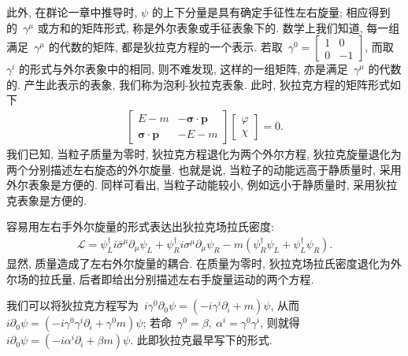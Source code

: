此外, 在群论一章中推导时, $\psi$ 的上下分量是具有确定手征性左右旋量; 相应得到的~$\gamma^\mu$ 或方和的矩阵形式, 称是外尔表象或手征表象下的. 数学上我们知道, 每一组满足~$\gamma^\mu$ 的代数的矩阵, 都是狄拉克方程的一个表示. 若取~$\gamma^0=\left[\begin{array}{cc}1&0\\0&-1\end{array}\right]$, 而取~$\gamma^i$ 的形式与外尔表象中的相同, 则不难发现, 这样的一组矩阵, 亦是满足~$\gamma^\mu$ 的代数的. 产生此表示的表象, 我们称为泡利-狄拉克表象. 此时, 狄拉克方程的矩阵形式如下
\begin{align}
\left[\begin{array}{cc}
E-m&-\bm{\sigma}\cdot\bm{p}\\
\bm{\sigma}\cdot\bm{p}&-E-m
\end{array}\right]
\left[\begin{array}{c}\varphi\\\chi\end{array}\right]=0.
\end{align}
我们已知, 当粒子质量为零时, 狄拉克方程退化为两个外尔方程, 狄拉克旋量退化为两个分别描述左右旋态的外尔旋量. 也就是说, 当粒子的动能远高于静质量时, 采用外尔表象是方便的. 同样可看出, 当粒子动能较小, 例如远小于静质量时, 采用狄拉克表象是方便的.

容易用左右手外尔旋量的形式表达出狄拉克场拉氏密度:
\begin{align}
\mathcal{L}=\psi^\dag_L i\bar{\sigma}^\mu\partial_\mu\psi_L+\psi^\dag_R i\sigma^\mu\partial_\mu\psi_R-m(\psi_R^\dag\psi_L+\psi^\dag_L\psi_R).
\end{align}
显然, 质量造成了左右外尔旋量的耦合. 在质量为零时, 狄拉克场拉氏密度退化为外尔场的拉氏量, 后者即给出分别描述左右手旋量运动的两个方程.

我们可以将狄拉克方程写为~$i\gamma^0\partial_0\psi=(-i\gamma^i\partial_i+m)\psi$, 从而~$i\partial_0\psi=(-i\gamma^0\gamma^i\partial_i+\gamma^0m)\psi$; 若命~$\gamma^0=\beta,~\alpha^i=\gamma^0\gamma^i$, 则就得~$i\partial_0\psi=(-i\alpha^i\partial_i+\beta m)\psi$. 此即狄拉克最早写下的形式.







